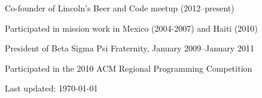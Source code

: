 \documentclass[10pt,letterpaper]{article}
\renewenvironment{itemize}{
  \begin{list}{}{
    \setlength{\leftmargin}{1.5em}
    \setlength{\itemsep}{0.25em}
    \setlength{\parskip}{0pt}
    \setlength{\parsep}{0.25em}
  }
}{
  \end{list}
}
\begin{document}
\begin{itemize}
    \item Co-founder of Lincoln's Beer and Code meetup (2012--present)
    \item Participated in mission work in Mexico (2004-2007) and Haiti (2010)
    \item President of Beta Sigma Psi Fraternity, January 2009--January 2011
    \item Participated in the 2010 ACM Regional Programming Competition
\end{itemize}

\bigskip

\begin{center}
  \begin{small}
    Last updated: \today
  \end{small}
\end{center}
\end{document}
